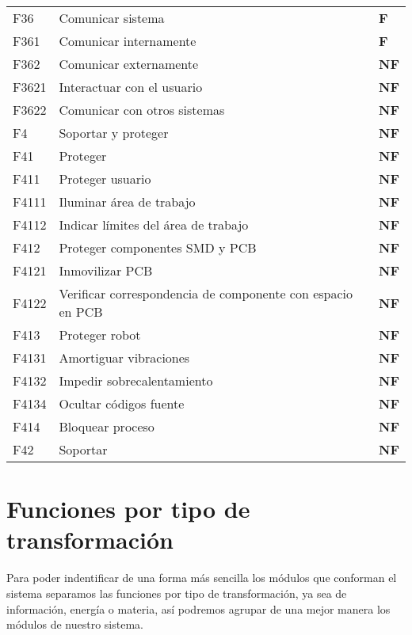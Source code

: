 \begin{center}
\begin{supertabular}{p{3em}p{15em}p{3em}}
    F36   & Comunicar sistema & \textbf{F} \\
    F361  & Comunicar internamente & \textbf{F} \\
    F362  & Comunicar externamente & \textbf{NF} \\
    F3621 & Interactuar con el usuario & \textbf{NF} \\
    F3622 & Comunicar con otros sistemas & \textbf{NF} \\
    \hline
    F4    & Soportar y proteger & \textbf{NF} \\
    F41   & Proteger & \textbf{NF} \\
    F411  & Proteger usuario & \textbf{NF} \\
    F4111 & Iluminar \'area de trabajo & \textbf{NF} \\
    F4112 & Indicar l\'imites del \'area de trabajo & \textbf{NF} \\
    F412  & Proteger componentes SMD y PCB & \textbf{NF} \\
    F4121 & Inmovilizar PCB & \textbf{NF} \\
    F4122 & Verificar correspondencia de componente con espacio en PCB & \textbf{NF} \\
    F413  & Proteger robot & \textbf{NF} \\
    F4131 & Amortiguar vibraciones & \textbf{NF} \\
    F4132 & Impedir sobrecalentamiento & \textbf{NF} \\
    F4134 & Ocultar c\'odigos fuente & \textbf{NF} \\
    F414  & Bloquear proceso & \textbf{NF} \\
    F42   & Soportar & \textbf{NF} \\
    \end{supertabular}%
  \label{estructuraF}%
\end{center}

\section{Funciones por tipo de transformaci\'on}
%
Para poder indentificar de una forma m\'as sencilla los m\'odulos que conforman el sistema separamos las funciones por tipo de transformaci\'on, ya sea de informaci\'on, energ\'ia o materia, as\'i podremos agrupar de una mejor manera los m\'odulos de nuestro sistema.

